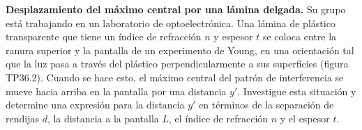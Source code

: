 \item \textbf{Desplazamiento del máximo central por una lámina delgada.}
Su grupo está trabajando en un laboratorio de optoelectrónica. Una lámina de plástico transparente que tiene un índice de refracción $n$ y espesor $t$ se coloca entre la ranura superior y la pantalla de un experimento de Young, en una orientación tal que la luz pasa a través del plástico perpendicularmente a sus superficies (figura TP36.2). Cuando se hace esto, el máximo central del patrón de interferencia se mueve hacia arriba en la pantalla por una distancia $y'$. Investigue esta situación y determine una expresión para la distancia $y'$ en términos de la separación de rendijas $d$, la distancia a la pantalla $L$, el índice de refracción $n$ y el espesor $t$.